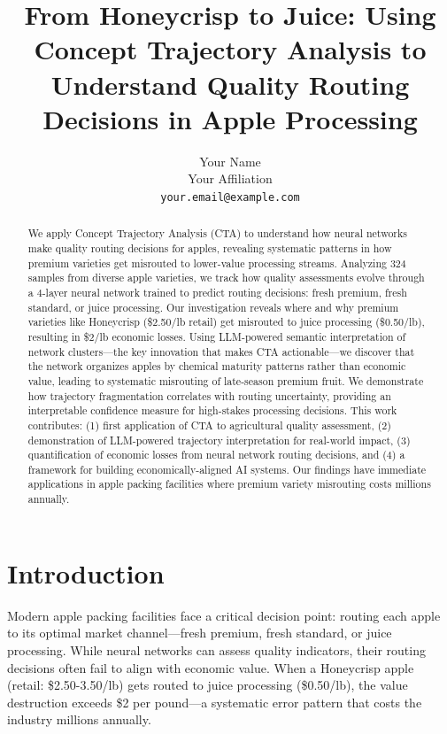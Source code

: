 \documentclass[11pt,a4paper]{article}
\title{From Honeycrisp to Juice: Using Concept Trajectory Analysis to Understand Quality Routing Decisions in Apple Processing}
\author{Your Name \\
Your Affiliation \\
\texttt{your.email@example.com}}
\date{}
\begin{document}
\maketitle

\begin{abstract}
We apply Concept Trajectory Analysis (CTA) to understand how neural networks make quality routing decisions for apples, revealing systematic patterns in how premium varieties get misrouted to lower-value processing streams. Analyzing 324 samples from diverse apple varieties, we track how quality assessments evolve through a 4-layer neural network trained to predict routing decisions: fresh premium, fresh standard, or juice processing. Our investigation reveals where and why premium varieties like Honeycrisp (\$2.50/lb retail) get misrouted to juice processing (\$0.50/lb), resulting in \$2/lb economic losses. Using LLM-powered semantic interpretation of network clusters—the key innovation that makes CTA actionable—we discover that the network organizes apples by chemical maturity patterns rather than economic value, leading to systematic misrouting of late-season premium fruit. We demonstrate how trajectory fragmentation correlates with routing uncertainty, providing an interpretable confidence measure for high-stakes processing decisions. This work contributes: (1) first application of CTA to agricultural quality assessment, (2) demonstration of LLM-powered trajectory interpretation for real-world impact, (3) quantification of economic losses from neural network routing decisions, and (4) a framework for building economically-aligned AI systems. Our findings have immediate applications in apple packing facilities where premium variety misrouting costs millions annually.
\end{abstract}

\section{Introduction}

Modern apple packing facilities face a critical decision point: routing each apple to its optimal market channel—fresh premium, fresh standard, or juice processing. While neural networks can assess quality indicators, their routing decisions often fail to align with economic value. When a Honeycrisp apple (retail: \$2.50-3.50/lb) gets routed to juice processing (\$0.50/lb), the value destruction exceeds \$2 per pound—a systematic error pattern that costs the industry millions annually.
\end{document}
